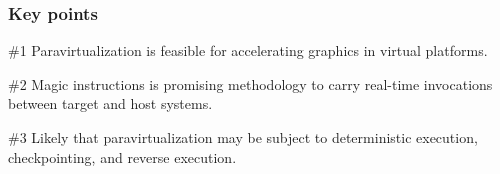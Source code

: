 
\begin{frame}
\frametitle{Key points}

\begin{block}{\#1}
	Paravirtualization is feasible for accelerating graphics in virtual platforms.
\end{block}

\begin{block}{\#2}
	Magic instructions is promising methodology to carry real-time invocations between target and host systems.
\end{block}

\begin{block}{\#3}
	Likely that paravirtualization may be subject to deterministic execution, checkpointing, and reverse execution.
\end{block}

\end{frame}
